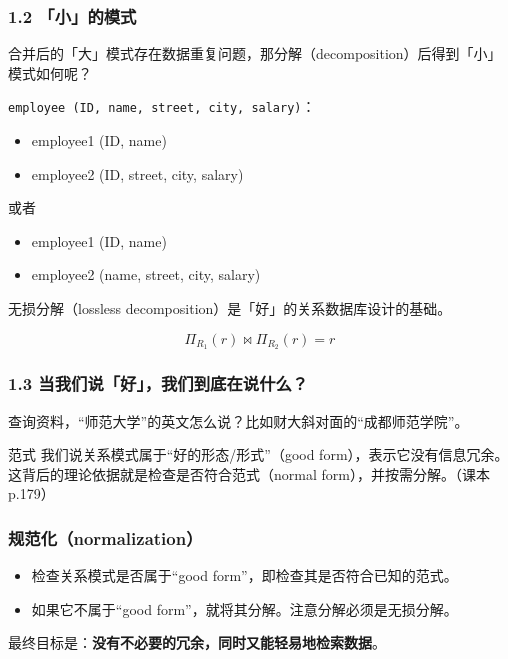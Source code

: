 \documentclass[aspectratio=169, 14pt]{beamer}
\begin{document}
\begin{frame}
	\frametitle{1.2 「小」的模式}
	合并后的「大」模式存在数据重复问题，那分解（decomposition）后得到「小」模式如何呢？

	\texttt{employee (ID, name, street, city, salary)}：

	\begin{itemize}
		\item employee1 (ID, name)
		\item employee2 (ID, street, city, salary)
	\end{itemize}

	或者
	\begin{itemize}
		\item employee1 (ID, name)
		\item employee2 (name, street, city, salary)
	\end{itemize}

\end{frame}

{
\begin{frame}[standout]
	无损分解（lossless decomposition）是「好」的关系数据库设计的基础。

	\[\Pi_{R_1}(r) \Join  \Pi_{R_2}(r) = r\]
\end{frame}
}

\begin{frame}
	\frametitle{1.3 当我们说「好」，我们到底在说什么？}

	 查询资料，“师范大学”的英文怎么说？比如财大斜对面的“成都师范学院”。

	\pause
	\begin{exampleblock}{范式}
		我们说关系模式属于“好的形态/形式”（good form），表示它\alert{没有信息冗余}。这背后的理论依据就是检查是否符合\alert{范式}（normal form），并按需\alert{分解}。（课本p.179）
	\end{exampleblock}
\end{frame}

\begin{frame}
	\frametitle{规范化（normalization）}

	\begin{itemize}
		\item 检查关系模式是否属于“good form”，即检查其是否符合已知的范式。
		\item 如果它不属于“good form”，就将其分解。注意分解必须是无损分解。
	\end{itemize}

	 最终目标是：\textbf{没有不必要的冗余，同时又能轻易地检索数据}。
\end{frame}
\end{document}

